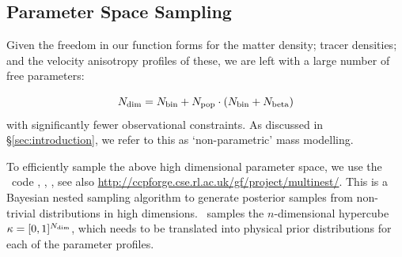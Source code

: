 \subsection{Parameter Space Sampling}
Given the freedom in our function forms for the matter density; tracer
densities; and the velocity anisotropy profiles of these, we are left with a
large number of free parameters:

\begin{equation}
    N_{\rm dim} = N_{\rm bin} + N_{\rm pop}\cdot(N_{\rm bin}+N_{\rm beta})
\end{equation}
with significantly fewer observational constraints. As discussed in
\S\ref{sec:introduction}, we refer to this as `non-parametric' mass modelling.

To efficiently sample the above high dimensional parameter space, we use the
\MultiNest\ code \citep{FerozHobson2008}, \citep{Feroz+2009},
\citep{Feroz+2013}, see also
\url{http://ccpforge.cse.rl.ac.uk/gf/project/multinest/}. This is a Bayesian
nested sampling algorithm to generate posterior samples from non-trivial
distributions in high dimensions. \MultiNest\ samples the $n$-dimensional
hypercube $\kappa=[0,1]^{N_{\rm dim}}$, which needs to be translated into
physical prior distributions for each of the parameter profiles.

